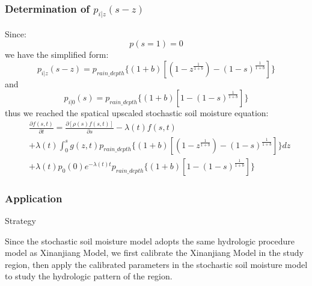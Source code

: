 \documentclass{beamer}
\begin{document}
\begin{frame}
\frametitle{Determination of $p_{i|z}(s-z)$}
Since:
\begin{equation}
p(s=1)=0
\end{equation}
we have the simplified form:
\begin{equation}
p_{i|z}(s-z)=p_{rain\_depth} \lbrace(1+b)[(1-z^{\frac{1}{1+b}})-(1-s)^{\frac{1}{1+b}}]\rbrace
\end{equation}
and
\begin{equation}
p_{i|0}(s)=p_{rain\_depth} \lbrace(1+b)[1-(1-s)^{\frac{1}{1+b}}]\rbrace
\end{equation}
thus we reached the spatical upscaled stochastic soil moisture equation:
 \begin{equation}
 \begin{split}
 &\frac{\partial{f(s,t)}}{\partial t}=\frac{\partial{[\rho(s)f(s,t)]}}{\partial s}-\lambda(t)f(s,t)\\&+\lambda(t)\int_{0}^{s} g(z,t)p_{rain\_depth} \lbrace(1+b)[(1-z^{\frac{1}{1+b}})-(1-s)^{\frac{1}{1+b}}]\rbrace dz\\&+\lambda(t)p_0(0)e^{-\lambda(t) t}p_{rain\_depth} \lbrace(1+b)[1-(1-s)^{\frac{1}{1+b}}]\rbrace
 \end{split}
 \end{equation}


\end{frame}
\begin{frame}
\frametitle{Application}
\begin{center}
Strategy
\end{center}
Since the stochastic soil moisture model adopts the same hydrologic procedure model as Xinanjiang Model, we first calibrate the Xinanjiang Model in the study region, then apply the calibrated parameters in the stochastic soil moisture model to study the hydrologic pattern of the region.
\end{frame}
\end{document}
